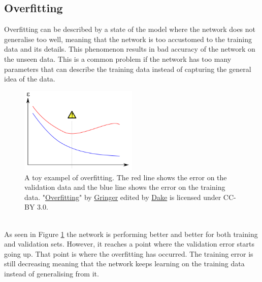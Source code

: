 \subsection{Overfitting}\label{sec:overfitting}
Overfitting can be described by a state of the model where the network does not generalise too well, meaning that the network is too accustomed to the training data and its details. This phenomenon results in bad accuracy of the network on the unseen data. This is a common problem if the network has too many parameters that can describe the training data instead of capturing the general idea of the data.
\begin{figure}[h]
    \centering
    \includegraphics[width=0.5\textwidth]{figure/ann/overfitting}
    \caption{A toy exampel of overfitting. The red line shows the error on the validation data and the blue line shows the error on the training data. 
    "\href{https://en.wikipedia.org/wiki/Overfitting\#/media/File:Overfitting_svg.svg}{Overfitting}" by
    \href{https://commons.wikimedia.org/wiki/User:Gringer}{Gringer} edited by
    \href{https://commons.wikimedia.org/wiki/User\:Dake}{Dake} is licensed under CC-BY 3.0.}
    \label{fig:overfitting}
\end{figure}
\\
As seen in Figure \ref{fig:overfitting} the network is performing better and better for both training and validation sets. However, it reaches a point where the validation error starts going up. That point is where the overfitting has occurred. The training error is still decreasing meaning that the network keeps learning on the training data instead of generalising from it. 

